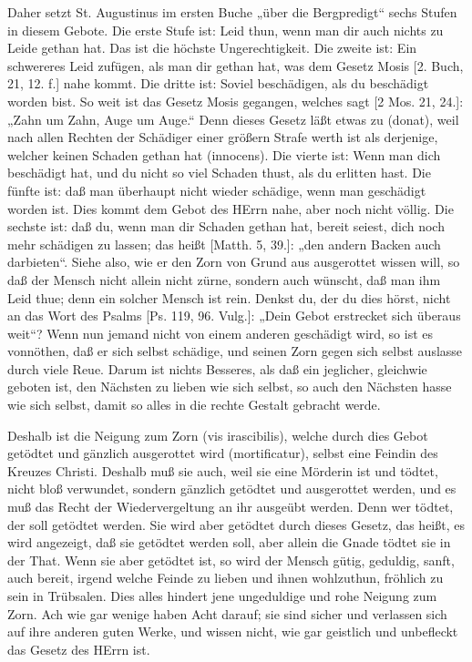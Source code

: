 Daher setzt St. Augustinus im ersten Buche „über die Bergpredigt“ sechs Stufen in diesem Gebote. Die erste Stufe ist: Leid thun, wenn man dir auch nichts zu Leide gethan hat. Das ist die höchste Ungerechtigkeit. Die zweite ist: Ein schwereres Leid zufügen, als man dir gethan hat, was dem Gesetz Mosis [2. Buch, 21, 12. f.] nahe kommt. Die dritte ist: Soviel beschädigen, als du beschädigt worden bist. So weit ist das Gesetz Mosis gegangen, welches sagt [2 Mos. 21, 24.]: „Zahn um Zahn, Auge um Auge.“ Denn dieses Gesetz läßt etwas zu (donat), weil nach allen Rechten der Schädiger einer größern Strafe werth ist als derjenige, welcher keinen Schaden gethan hat (innocens). Die vierte ist: Wenn man dich beschädigt hat, und du nicht so viel Schaden thust, als du erlitten hast. Die fünfte ist: daß man überhaupt nicht wieder schädige, wenn man geschädigt worden ist. Dies kommt dem Gebot des HErrn nahe, aber noch nicht völlig. Die sechste ist: daß du, wenn man dir Schaden gethan hat, bereit seiest, dich noch mehr schädigen zu lassen; das heißt
[Matth. 5, 39.]: „den andern Backen auch darbieten“. Siehe also, wie er den Zorn von Grund aus ausgerottet wissen will, so daß der Mensch nicht allein nicht zürne, sondern auch wünscht, daß man ihm Leid thue; denn ein solcher Mensch ist rein. Denkst du, der du dies hörst, nicht an das Wort des Psalms [Ps. 119, 96. Vulg.]: „Dein Gebot erstrecket sich überaus weit“? Wenn nun jemand nicht von einem anderen geschädigt wird, so ist es vonnöthen, daß er sich selbst schädige, und seinen Zorn gegen sich selbst auslasse durch viele Reue. Darum ist nichts Besseres, als daß ein jeglicher, gleichwie geboten ist, den Nächsten zu lieben wie sich selbst, so auch den Nächsten hasse wie sich selbst, damit so alles in die rechte Gestalt gebracht werde.

Deshalb ist die Neigung zum Zorn (vis irascibilis), welche durch dies Gebot getödtet und gänzlich ausgerottet wird (mortificatur), selbst eine Feindin des Kreuzes Christi. Deshalb muß sie auch, weil sie eine Mörderin ist und tödtet, nicht bloß verwundet, sondern gänzlich getödtet und ausgerottet werden, und es muß das Recht der Wiedervergeltung an ihr ausgeübt werden. Denn wer tödtet, der soll getödtet werden. Sie wird aber getödtet durch dieses Gesetz, das heißt, es wird angezeigt, daß sie getödtet werden soll, aber allein die Gnade tödtet sie in der That. Wenn sie aber getödtet ist, so wird der Mensch gütig, geduldig, sanft, auch bereit, irgend welche Feinde zu lieben und ihnen wohlzuthun, fröhlich zu sein in Trübsalen. Dies alles hindert jene ungeduldige und rohe Neigung zum Zorn. Ach wie gar wenige haben Acht darauf; sie sind sicher und verlassen sich auf ihre anderen guten Werke, und wissen nicht, wie gar geistlich und unbefleckt das Gesetz des HErrn ist.

